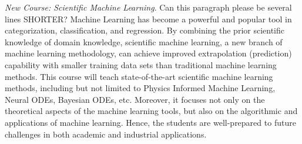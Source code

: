\documentclass[11pt]{NSFamsart}
\begin{document}

\emph{New Course: Scientific Machine Learning}. {\color{red}Can this paragraph please be several lines SHORTER?} 
Machine Learning has become a powerful and popular tool in categorization, classification, and regression.  By combining the prior scientific knowledge of domain knowledge, scientific machine learning, a new branch of machine learning methodology, can achieve improved extrapolation (prediction) capability with smaller training data sets than traditional machine learning methods.  This course will teach state-of-the-art scientific machine learning methods, including but not limited to Physics Informed Machine Learning, Neural ODEs, Bayesian ODEs, etc.  Moreover, it focuses not only on the theoretical aspects of the machine learning tools, but also on the algorithmic and applications of machine learning.  Hence, the students are well-prepared to future challenges in both academic and industrial applications. 

 
\end{document}

